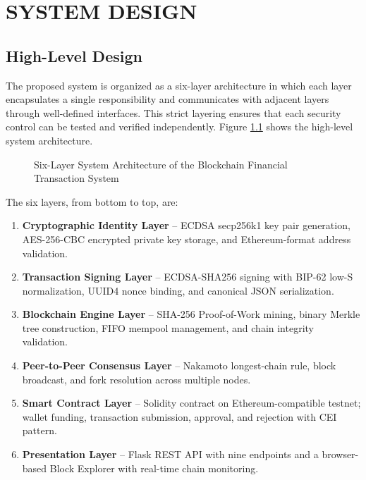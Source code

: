\documentclass[12pt,a4paper]{report}
\begin{document}
\chapter{SYSTEM DESIGN}

\section{High-Level Design}

The proposed system is organized as a six-layer architecture in which each layer encapsulates
a single responsibility and communicates with adjacent layers through well-defined interfaces.
This strict layering ensures that each security control can be tested and verified
independently. Figure \ref{fig:arch} shows the high-level system architecture.

\begin{figure}[H]
  \centering
  \caption{Six-Layer System Architecture of the Blockchain Financial Transaction System}
  \label{fig:arch}
\end{figure}

The six layers, from bottom to top, are:

\begin{enumerate}[label=\arabic*.]
  \item \textbf{Cryptographic Identity Layer} -- ECDSA secp256k1 key pair generation,
        AES-256-CBC encrypted private key storage, and Ethereum-format address validation.
  \item \textbf{Transaction Signing Layer} -- ECDSA-SHA256 signing with BIP-62 low-S
        normalization, UUID4 nonce binding, and canonical JSON serialization.
  \item \textbf{Blockchain Engine Layer} -- SHA-256 Proof-of-Work mining, binary Merkle
        tree construction, FIFO mempool management, and chain integrity validation.
  \item \textbf{Peer-to-Peer Consensus Layer} -- Nakamoto longest-chain rule, block
        broadcast, and fork resolution across multiple nodes.
  \item \textbf{Smart Contract Layer} -- Solidity contract on Ethereum-compatible testnet;
        wallet funding, transaction submission, approval, and rejection with CEI pattern.
  \item \textbf{Presentation Layer} -- Flask REST API with nine endpoints and a browser-based
        Block Explorer with real-time chain monitoring.
\end{enumerate}
\end{document}
